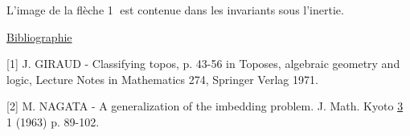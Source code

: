 L'image de la flèche \textcircled{1} est contenue dans les invariants sous l'inertie.


\underline{Bibliographie}

[1]    J. GIRAUD  - Classifying topos, p. 43-56 in Toposes, algebraic geometry and logic, Lecture Notes in Mathematics 274, Springer Verlag 1971.

[2]    M. NAGATA - A generalization of the imbedding problem. J. Math. Kyoto \underline{3} 1 (1963) p. 89-102.
